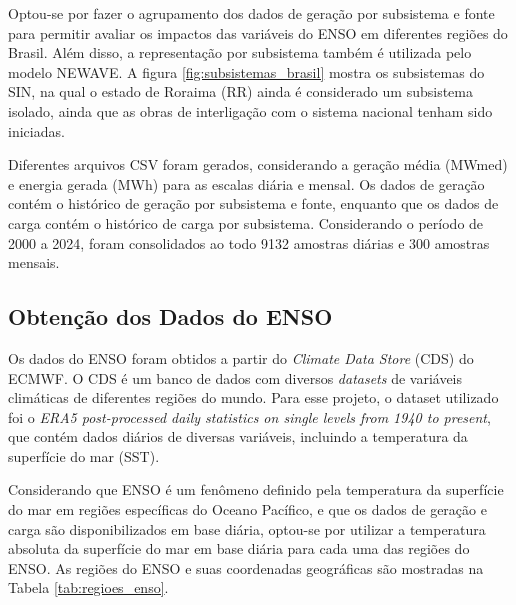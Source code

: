 \begin{figure}[!ht]
	{}
	{}
\end{figure}

Optou-se por fazer o agrupamento dos dados de geração por subsistema e fonte para permitir avaliar os impactos das variáveis
do ENSO em diferentes regiões do Brasil. Além disso, a representação por subsistema também é utilizada pelo modelo NEWAVE. 
A figura \ref{fig:subsistemas_brasil} mostra os subsistemas do SIN, na qual o estado de Roraima (RR) ainda é considerado
um subsistema isolado, ainda que as obras de interligação com o sistema nacional tenham sido iniciadas.

Diferentes arquivos CSV foram gerados, considerando a geração média (MWmed) e energia gerada (MWh) para as escalas diária e mensal.
Os dados de geração contém o histórico de geração por subsistema e fonte, enquanto que os dados de carga contém o histórico de carga
por subsistema. Considerando o período de 2000 a 2024, foram consolidados ao todo 9132 amostras diárias e 300 amostras mensais.

\subsection{Obtenção dos Dados do ENSO} %
Os dados do ENSO foram obtidos a partir do \textit{Climate Data Store} (CDS) do ECMWF. O CDS é um banco de dados com diversos
\textit{datasets} de variáveis climáticas de diferentes regiões do mundo. Para esse projeto, o dataset utilizado foi o 
\textit{ERA5 post-processed daily statistics on single levels from 1940 to present}, que contém dados diários de diversas 
variáveis, incluindo a temperatura da superfície do mar (SST).

Considerando que ENSO é um fenômeno definido pela temperatura da superfície do mar em regiões 
específicas do Oceano Pacífico, e que os dados de geração e carga são disponibilizados em base diária,
optou-se por utilizar a temperatura absoluta da superfície do mar em base diária para cada uma das regiões do ENSO. As
regiões do ENSO e suas coordenadas geográficas são mostradas na Tabela \ref{tab:regioes_enso}.

